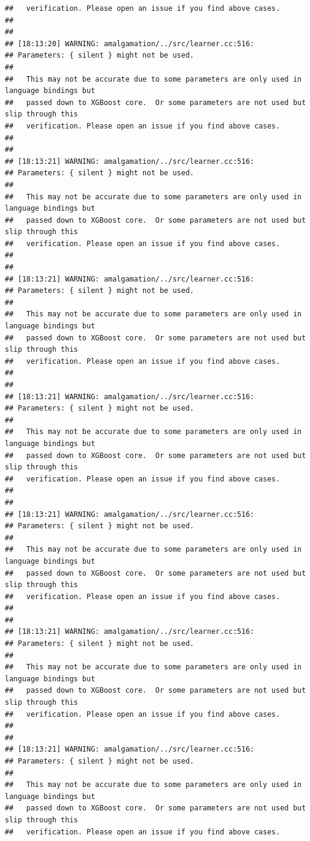 \documentclass[AMS,STIX2COL]{WileyNJD-v2}\usepackage[]{graphicx}\usepackage[]{color}
\makeatletter
\newenvironment{kframe}{%
 \def\at@end@of@kframe{}%
 \ifinner\ifhmode%
  \def\at@end@of@kframe{\end{minipage}}%
  \begin{minipage}{\columnwidth}%
 \fi\fi%
 \def\FrameCommand##1{\hskip\@totalleftmargin \hskip-\fboxsep
 \colorbox{shadecolor}{##1}\hskip-\fboxsep
     \hskip-\linewidth \hskip-\@totalleftmargin \hskip\columnwidth}%
 \MakeFramed {\advance\hsize-\width
   \@totalleftmargin\z@ \linewidth\hsize
   \@setminipage}}%
 {\par\unskip\endMakeFramed%
 \at@end@of@kframe}
\newenvironment{knitrout}{}{} %
\makeatother
\begin{document}
\begin{knitrout}
\begin{kframe}
\begin{verbatim}
##   verification. Please open an issue if you find above cases.
## 
## 
## [18:13:20] WARNING: amalgamation/../src/learner.cc:516: 
## Parameters: { silent } might not be used.
## 
##   This may not be accurate due to some parameters are only used in language bindings but
##   passed down to XGBoost core.  Or some parameters are not used but slip through this
##   verification. Please open an issue if you find above cases.
## 
## 
## [18:13:21] WARNING: amalgamation/../src/learner.cc:516: 
## Parameters: { silent } might not be used.
## 
##   This may not be accurate due to some parameters are only used in language bindings but
##   passed down to XGBoost core.  Or some parameters are not used but slip through this
##   verification. Please open an issue if you find above cases.
## 
## 
## [18:13:21] WARNING: amalgamation/../src/learner.cc:516: 
## Parameters: { silent } might not be used.
## 
##   This may not be accurate due to some parameters are only used in language bindings but
##   passed down to XGBoost core.  Or some parameters are not used but slip through this
##   verification. Please open an issue if you find above cases.
## 
## 
## [18:13:21] WARNING: amalgamation/../src/learner.cc:516: 
## Parameters: { silent } might not be used.
## 
##   This may not be accurate due to some parameters are only used in language bindings but
##   passed down to XGBoost core.  Or some parameters are not used but slip through this
##   verification. Please open an issue if you find above cases.
## 
## 
## [18:13:21] WARNING: amalgamation/../src/learner.cc:516: 
## Parameters: { silent } might not be used.
## 
##   This may not be accurate due to some parameters are only used in language bindings but
##   passed down to XGBoost core.  Or some parameters are not used but slip through this
##   verification. Please open an issue if you find above cases.
## 
## 
## [18:13:21] WARNING: amalgamation/../src/learner.cc:516: 
## Parameters: { silent } might not be used.
## 
##   This may not be accurate due to some parameters are only used in language bindings but
##   passed down to XGBoost core.  Or some parameters are not used but slip through this
##   verification. Please open an issue if you find above cases.
## 
## 
## [18:13:21] WARNING: amalgamation/../src/learner.cc:516: 
## Parameters: { silent } might not be used.
## 
##   This may not be accurate due to some parameters are only used in language bindings but
##   passed down to XGBoost core.  Or some parameters are not used but slip through this
##   verification. Please open an issue if you find above cases.

\end{verbatim}
\end{kframe}
\end{knitrout}
\end{document}
